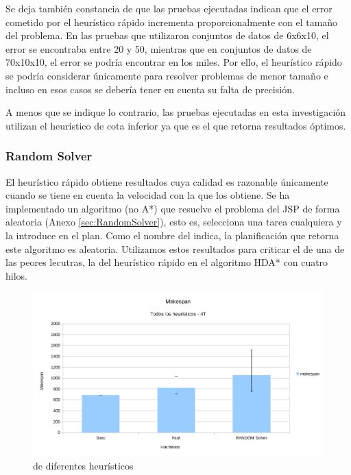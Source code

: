 Se deja también constancia de que las pruebas ejecutadas indican que
el error cometido por el heurístico rápido incrementa proporcionalmente
con el tamaño del problema.
En las pruebas que utilizaron conjuntos de datos de 6x6x10,
el error se encontraba entre 20 y 50, mientras que en
conjuntos de datos de 70x10x10, el error se podría encontrar
en los miles.
Por ello, el heurístico rápido se podría considerar únicamente para
resolver problemas de menor tamaño e incluso en esos casos
se debería tener en cuenta su falta de precisión.

\begin{notebox}
    A menos que se indique lo contrario,
    las pruebas ejecutadas en esta investigación utilizan el heurístico de
    cota inferior ya que es el que retorna resultados óptimos.
\end{notebox}

\subsubsection{Random Solver}

El heurístico rápido obtiene resultados cuya calidad es razonable
únicamente cuando se tiene en cuenta la velocidad con la que
los obtiene.
Se ha implementado un algoritmo (no A*) que resuelve
el problema del JSP de forma aleatoria (Anexo \ref{sec:RandomSolver}),
esto es, selecciona una tarea cualquiera y la introduce en el plan.
Como el nombre del  indica, la planificación
que retorna este algoritmo es aleatoria.
Utilizamos estos resultados para criticar el 
de una de las peores lecutras,
la del heurístico rápido en el algoritmo HDA* con cuatro hilos.

\begin{figure}[h]
    \centering
    \includegraphics[width=\textwidth]{Media/Ch2/Makespan_Random_Solver.png}
    \caption{ de diferentes heurísticos}
    \label{fig:MakespanRandomSolver}
\end{figure}

